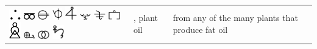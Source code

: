 \documentclass[british,final,landscape]{scrartcl}
\begin{document}
\begin{refsection}
\begin{supertabular}{p{0.3\textwidth}p{0.34\textwidth}p{0.34\textwidth}}
   \includegraphics[width=5mm]{Plant/Oil1} \includegraphics[width=5mm]{Plant/Oil4} \includegraphics[width=5mm]{Plant/Oil6} \includegraphics[height=5mm]{Plant/Oil9} \includegraphics[width=5mm]{Plant/Oil10} \includegraphics[width=5mm]{Plant/Oil11} \includegraphics[width=5mm]{Plant/Oil12} \includegraphics[width=5mm]{Plant/Oil13} \includegraphics[width=5mm]{Plant/Oil14} \includegraphics[width=5mm]{Plant/Oil15} \includegraphics[width=5mm]{Plant/Oil16} \includegraphics[width=5mm]{Plant/Oil17} & , plant oil & from any of the many plants that produce fat oil \\

\end{supertabular}
\end{refsection}
\end{document}
